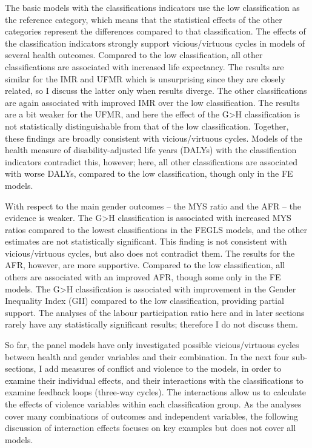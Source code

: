 \documentclass[12pt]{article}
\begin{document}
The basic models with the classifications indicators use the low classification as the reference category, which means that the statistical effects of the other categories represent the differences compared to that classification.
The effects of the classification indicators strongly support vicious/virtuous cycles in models of several health outcomes.
Compared to the low classification, all other classifications are associated with increased life expectancy.
The results are similar for the IMR and UFMR which is unsurprising since they are closely related, so I discuss the latter only when results diverge.
The other classifications are again associated with improved IMR over the low classification. The results are a bit weaker for the UFMR, and here the effect of the G>H classification is not statistically distinguishable from that of the low classification.
Together, these findings are broadly consistent with vicious/virtuous cycles.
Models of the health measure of disability-adjusted life years (DALYs) with the classification indicators contradict this, however; here, all other classifications are associated with worse DALYs, compared to the low classification, though only in the FE models.

With respect to the main gender outcomes -- the MYS ratio and the AFR -- the evidence is weaker.
The G>H classification is associated with increased MYS ratios compared to the lowest classifications in the FEGLS models, and the other estimates are not statistically significant.
This finding is not consistent with vicious/virtuous cycles, but also does not contradict them.
The results for the AFR, however, are more supportive.
Compared to the low classification, all others are associated with an improved AFR, though some only in the FE models.
The G>H classification is associated with improvement in the Gender Inequality Index (GII) compared to the low classification, providing partial support.
The analyses of the labour participation ratio here and in later sections rarely have any statistically significant results; therefore I do not discuss them.

So far, the panel models have only investigated possible vicious/virtuous cycles between health and gender variables and their combination.
In the next four sub-sections, I add measures of conflict and violence to the models, in order to examine their individual effects, and their interactions with the classifications to examine feedback loops (three-way cycles).
The interactions allow us to calculate the effects of violence variables within each classification group.
As the analyses cover many combinations of outcomes and independent variables, the following discussion of interaction effects focuses on key examples but does not cover all models.
\end{document}
